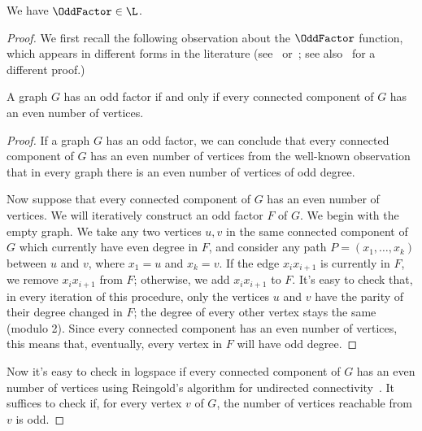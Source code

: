 \documentclass[11pt]{article}
\begin{document}
\begin{theorem}
    \label{thm:oddfactor-logspace}
    We have $\OddFactor \in \L$.
\end{theorem}
\begin{proof}
    We first recall the following observation about the $\OddFactor$
    function, which appears in different forms in the literature
    (see~\cite[Lemma 4.1]{DBLP:journals/jacm/Urquhart87}
    or~\cite[Lemma 18.16]{jukna_2012};
    see also~\cite[Proposition 1]{joh03} for a different proof.)
    \begin{claim*}
        A graph $G$ has an odd factor if and only if
        every connected component of $G$ has an even number of vertices.
    \end{claim*}
    \begin{proof}
        If a graph $G$ has an odd factor, 
        we can conclude
        that every
        connected
        component of $G$ has an even number of vertices
        from the well-known observation
        that in every graph 
        there is an even number of vertices of odd degree.

        Now suppose that every connected component of $G$ 
        has an even number of vertices.
        We will iteratively construct an odd factor $F$ of $G$.
        We begin with the empty graph.
        We take any two vertices $u,v$ in the same
        connected component of $G$
        which currently have even degree in $F$,
        and consider any path
        $P = (x_1,\dots,x_{k})$
        between $u$ and $v$,
        where $x_1 = u$ and $x_{k}=v$.
        If the edge $x_i x_{i+1}$ is currently in $F$, we remove 
        $x_i x_{i+1}$ from $F$; otherwise, we add $x_i x_{i+1}$ to
        $F$.
        It's easy to check that, in every iteration of this procedure,
        only the vertices $u$ and $v$ have the parity of their degree
        changed in $F$; the degree of every other vertex stays the same
        (modulo 2).
        Since every connected component has an even number of vertices,
        this means that, eventually, every vertex in $F$ will have odd
        degree.
    \end{proof}
    Now it's easy to check in logspace if every connected component of $G$ has an even
    number of vertices using Reingold's algorithm for undirected
    connectivity~\cite{DBLP:conf/stoc/Reingold05}.
    It suffices to check if, for every vertex $v$ of $G$,
    the number of vertices reachable from $v$ is odd.
\end{proof}
\end{document}
